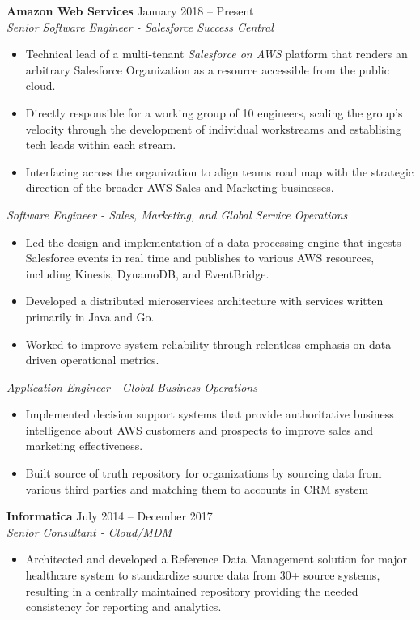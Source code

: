 \documentclass[10pt]{cv} %
\begin{document}
\begin{resume}
{\bf Amazon Web Services} \hfill January 2018 -- Present \\
{\sl Senior Software Engineer - Salesforce Success Central }
\begin{itemize} \itemsep -2pt %
\item Technical lead of a multi-tenant \textit{Salesforce on AWS} platform that renders an arbitrary Salesforce Organization as a resource accessible from the public cloud.
\item Directly responsible for a working group of 10 engineers, scaling the group's velocity through the development of individual workstreams and establising tech leads within each stream.
\item Interfacing across the organization to align teams road map with the strategic direction of the broader AWS Sales and Marketing businesses. 
\end{itemize}
{\sl Software Engineer - Sales, Marketing, and Global Service Operations }
\begin{itemize} \itemsep -2pt %
\item Led the design and implementation of a data processing engine that ingests Salesforce events in real time and publishes to various AWS resources, including Kinesis, DynamoDB, and EventBridge.
\item Developed a distributed microservices architecture with services written primarily in Java and Go.
\item Worked to improve system reliability through relentless emphasis on data-driven operational metrics.
\end{itemize}
{\sl Application Engineer - Global Business Operations }
\begin{itemize} \itemsep -2pt %
\item Implemented decision support systems that provide authoritative business intelligence about AWS customers and prospects to improve sales and marketing effectiveness. 
\item Built source of truth repository for organizations by sourcing data from various third parties and matching them to accounts in CRM system
\end{itemize}

{\bf Informatica } \hfill July 2014 -- December 2017 \\
{\sl Senior Consultant - Cloud/MDM }
\begin{itemize} \itemsep -2pt %
\item Architected and developed a Reference Data Management solution for major healthcare system to standardize source data from 30+ source systems, resulting in a centrally maintained repository providing the needed consistency for reporting and analytics.
\end{itemize}


\end{resume}
\end{document}
